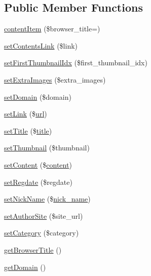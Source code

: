\subsection*{Public Member Functions}
\begin{DoxyCompactItemize}
\item 
\hyperlink{classcontentItem_a6d43634cb803585fa2a0feb13f63fad4}{content\+Item} (\$browser\+\_\+title=\textquotesingle{}\textquotesingle{})
\item 
\hyperlink{classcontentItem_afe78ae4ab14d74305c86d27570d9a7f8}{set\+Contents\+Link} (\$link)
\item 
\hyperlink{classcontentItem_ab18307a6068a6cdde94369976fe730f4}{set\+First\+Thumbnail\+Idx} (\$first\+\_\+thumbnail\+\_\+idx)
\item 
\hyperlink{classcontentItem_a8f635dff719c18bf5e969b13ca901c74}{set\+Extra\+Images} (\$extra\+\_\+images)
\item 
\hyperlink{classcontentItem_a61b6be878a0183cd1c3dfde8f29d5c20}{set\+Domain} (\$domain)
\item 
\hyperlink{classcontentItem_aad5f15eead8728ad5e2636740c4ff145}{set\+Link} (\$\hyperlink{swfupload_8js_a440a52a9004fdab0700100a6ddb49f67}{url})
\item 
\hyperlink{classcontentItem_a5a29426d7878c413cd6d63e930ce0a0f}{set\+Title} (\$\hyperlink{ko_8install_8php_a5b072c5fd1d2228c6ba5cee13cd142e3}{title})
\item 
\hyperlink{classcontentItem_a0145a758535658fa776871bfd675be15}{set\+Thumbnail} (\$thumbnail)
\item 
\hyperlink{classcontentItem_ad7355ad724398f4fbc79832241767405}{set\+Content} (\$\hyperlink{classcontent}{content})
\item 
\hyperlink{classcontentItem_abb2dad632dd405213708d5c211518c82}{set\+Regdate} (\$regdate)
\item 
\hyperlink{classcontentItem_ae3175aa0291e75bf95cb1220e50a33e4}{set\+Nick\+Name} (\$\hyperlink{ko_8install_8php_a151ecae87a1f3d7e257aa089803086bd}{nick\+\_\+name})
\item 
\hyperlink{classcontentItem_af28f4f40f1ac95cee2d88fe1e7d4b683}{set\+Author\+Site} (\$site\+\_\+url)
\item 
\hyperlink{classcontentItem_aa8ba578ae6629d632a42a76da823c59f}{set\+Category} (\$category)
\item 
\hyperlink{classcontentItem_a1590559deb019ba22a637cf78408f242}{get\+Browser\+Title} ()
\item 
\hyperlink{classcontentItem_a7a513d119938877566418029c6124a45}{get\+Domain} ()

\end{DoxyCompactItemize}

